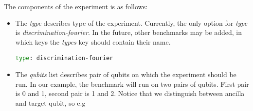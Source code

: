 \documentclass[preprint,12pt, a4paper, dvipsnames]{elsarticle}
\newcommand{\1}{{\rm 1\hspace{-0.9mm}l}}
\begin{document}
The components of the experiment is as follows:
\begin{itemize}
	\item The \textit{type} describes type of the experiment. Currently, the only option for \textit{type} is \textit{discrimination-fourier}. In the future, other benchmarks may be added, in which keys the \textit{types} key should contain their name.
	\begin{lstlisting}[language=Python]
type: discrimination-fourier
	\end{lstlisting}
	\item The \textit{qubits} list describes pair of qubits on which the experiment should be run. In our example, the benchmark will run on two pairs of qubits. First pair is 0 and 1, second pair is 1 and 2.
	Notice that we distinguish between ancilla and target qubit, so e.g
	

\end{itemize}
\end{document}
